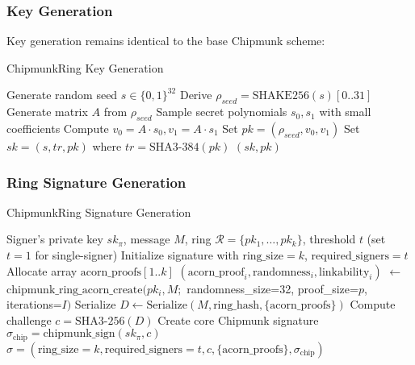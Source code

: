 \documentclass[11pt,a4paper]{article}
\begin{document}
\subsubsection{Key Generation}
Key generation remains identical to the base Chipmunk scheme:
\begin{algorithm}
\caption{ChipmunkRing Key Generation}
\begin{algorithmic}[1]
\STATE Generate random seed $s \in \{0,1\}^{32}$
\STATE Derive $\rho_{seed} = \text{SHAKE256}(s)[0..31]$
\STATE Generate matrix $A$ from $\rho_{seed}$
\STATE Sample secret polynomials $s_0, s_1$ with small coefficients
\STATE Compute $v_0 = A \cdot s_0, v_1 = A \cdot s_1$
\STATE Set $pk = (\rho_{seed}, v_0, v_1)$
\STATE Set $sk = (s, tr, pk)$ where $tr = \text{SHA3-384}(pk)$
\RETURN $(sk, pk)$
\end{algorithmic}
\end{algorithm}

\subsubsection{Ring Signature Generation}
\begin{algorithm}
\caption{ChipmunkRing Signature Generation}
\begin{algorithmic}[1]
\REQUIRE Signer's private key $sk_\pi$, message $M$, ring $\mathcal{R} = \{pk_1, \ldots, pk_k\}$, threshold $t$ (set $t=1$ for single-signer)
\STATE Initialize signature with $\text{ring\_size}=k$, $\text{required\_signers}=t$
\STATE Allocate array $\text{acorn\_proofs}[1..k]$
    \STATE $(\text{acorn\_proof}_i, \text{randomness}_i, \text{linkability}_i)$ $\leftarrow$ $\text{chipmunk\_ring\_acorn\_create}(pk_i, M;$ randomness\_size=32, proof\_size=$p$, iterations=$I)$
\ENDFOR
\STATE Serialize $D \leftarrow \text{Serialize}(M, \text{ring\_hash}, \{\text{acorn\_proofs}\})$
\STATE Compute challenge $c = \text{SHA3-256}(D)$ 
\STATE Create core Chipmunk signature $\sigma_{\text{chip}} = \text{chipmunk\_sign}(sk_\pi, c)$
\RETURN $\sigma = (\text{ring\_size}=k, \text{required\_signers}=t, c, \{\text{acorn\_proofs}\}, \sigma_{\text{chip}})$
\end{algorithmic}
\end{algorithm}
\end{document}
